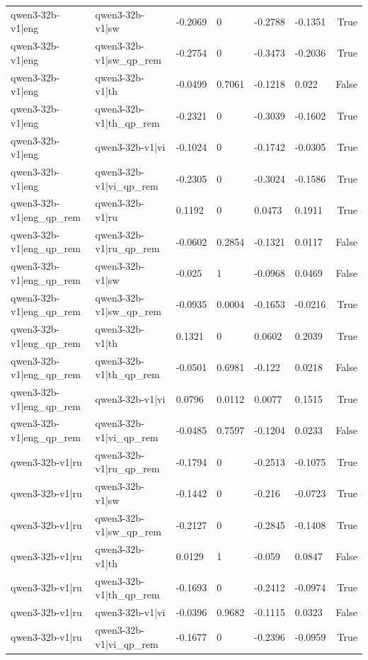 \begin{table}
\begin{tabular}{llllllr}
qwen3-32b-v1|eng & qwen3-32b-v1|sw & -0.2069 & 0 & -0.2788 & -0.1351 & True \\
qwen3-32b-v1|eng & qwen3-32b-v1|sw_qp_rem & -0.2754 & 0 & -0.3473 & -0.2036 & True \\
qwen3-32b-v1|eng & qwen3-32b-v1|th & -0.0499 & 0.7061 & -0.1218 & 0.022 & False \\
qwen3-32b-v1|eng & qwen3-32b-v1|th_qp_rem & -0.2321 & 0 & -0.3039 & -0.1602 & True \\
qwen3-32b-v1|eng & qwen3-32b-v1|vi & -0.1024 & 0 & -0.1742 & -0.0305 & True \\
qwen3-32b-v1|eng & qwen3-32b-v1|vi_qp_rem & -0.2305 & 0 & -0.3024 & -0.1586 & True \\
qwen3-32b-v1|eng_qp_rem & qwen3-32b-v1|ru & 0.1192 & 0 & 0.0473 & 0.1911 & True \\
qwen3-32b-v1|eng_qp_rem & qwen3-32b-v1|ru_qp_rem & -0.0602 & 0.2854 & -0.1321 & 0.0117 & False \\
qwen3-32b-v1|eng_qp_rem & qwen3-32b-v1|sw & -0.025 & 1 & -0.0968 & 0.0469 & False \\
qwen3-32b-v1|eng_qp_rem & qwen3-32b-v1|sw_qp_rem & -0.0935 & 0.0004 & -0.1653 & -0.0216 & True \\
qwen3-32b-v1|eng_qp_rem & qwen3-32b-v1|th & 0.1321 & 0 & 0.0602 & 0.2039 & True \\
qwen3-32b-v1|eng_qp_rem & qwen3-32b-v1|th_qp_rem & -0.0501 & 0.6981 & -0.122 & 0.0218 & False \\
qwen3-32b-v1|eng_qp_rem & qwen3-32b-v1|vi & 0.0796 & 0.0112 & 0.0077 & 0.1515 & True \\
qwen3-32b-v1|eng_qp_rem & qwen3-32b-v1|vi_qp_rem & -0.0485 & 0.7597 & -0.1204 & 0.0233 & False \\
qwen3-32b-v1|ru & qwen3-32b-v1|ru_qp_rem & -0.1794 & 0 & -0.2513 & -0.1075 & True \\
qwen3-32b-v1|ru & qwen3-32b-v1|sw & -0.1442 & 0 & -0.216 & -0.0723 & True \\
qwen3-32b-v1|ru & qwen3-32b-v1|sw_qp_rem & -0.2127 & 0 & -0.2845 & -0.1408 & True \\
qwen3-32b-v1|ru & qwen3-32b-v1|th & 0.0129 & 1 & -0.059 & 0.0847 & False \\
qwen3-32b-v1|ru & qwen3-32b-v1|th_qp_rem & -0.1693 & 0 & -0.2412 & -0.0974 & True \\
qwen3-32b-v1|ru & qwen3-32b-v1|vi & -0.0396 & 0.9682 & -0.1115 & 0.0323 & False \\
qwen3-32b-v1|ru & qwen3-32b-v1|vi_qp_rem & -0.1677 & 0 & -0.2396 & -0.0959 & True \\

\end{tabular}
\end{table}
